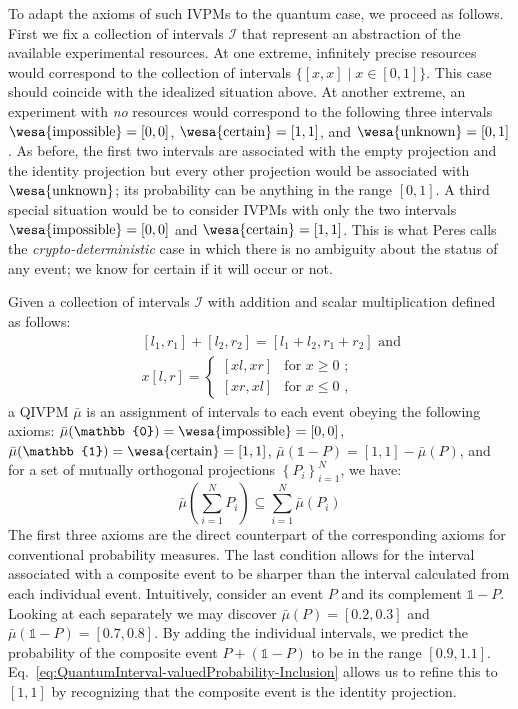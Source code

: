 \documentclass[english,reprint, aps, prl,superscriptaddress, showpacs,
showkeys, longbibliography, amsmath, amssymb]{revtex4-1}
\theoremstyle{plain}
\theoremstyle{definition}
\newcommand{\imposs}{{\text{\wesa{impossible}}}}
\newcommand{\necess}{{\text{\wesa{certain}}}}
\newcommand{\unknown}{{\text{\wesa{unknown}}}}
\begin{document}
To adapt the axioms of such IVPMs to the quantum case, we proceed as
follows. First we fix a collection of intervals $\mathscr{I}$ that
represent an abstraction of the available experimental resources. At
one extreme, infinitely precise resources would correspond to the
collection of intervals $\{[x,x] \mid x \in [0,1]\}$. This case should
coincide with the idealized situation above. At another extreme, an
experiment with \emph{no} resources would correspond to the following
three intervals $\imposs=\left[0,0\right]$,
$\necess=\left[1,1\right]$, and $\unknown=[0,1]$. As before, the first
two intervals are associated with the empty projection and the
identity projection but every other projection would be associated
with $\unknown$; its probability can be anything in the range
$[0,1]$. A third special situation would be to consider IVPMs with
only the two intervals $\imposs=\left[0,0\right]$ and
$\necess=\left[1,1\right]$. This is what Peres calls the
\emph{crypto-deterministic} case in which there is no ambiguity about
the status of any event; we know for certain if it will occur or not.

Given a collection of intervals $\mathscr{I}$ with addition and scalar
multiplication defined as follows: 
\begin{subequations}\label{eq:interval-operations}
\begin{eqnarray}
 &  & [l_{1},r_{1}]+[l_{2},r_{2}]=[l_{1}+l_{2},r_{1}+r_{2}]\textrm{ and}\\
 &  & x[l,r]=\begin{cases}
[xl,xr] & \textrm{for }x\ge0\textrm{ ;}\\{}
[xr,xl] & \textrm{for }x\le0\textrm{ ,}
\end{cases}
\end{eqnarray}
\end{subequations}
a QIVPM $\bar{\mu}$ is an assignment of intervals to each event
obeying the following axioms:
$\bar{\mu}(\mathbb{0})=\imposs=\left[0,0\right]$,
$\bar{\mu}(\mathbb{1})=\necess=\left[1,1\right]$,
$\bar{\mu}\left(\mathbb{1}-P\right)=\left[1,1\right]-\bar{\mu}\left(P\right)$,
and for a set of mutually orthogonal projections
$\left\{ P_{i}\right\} _{i=1}^{N}$, we have:
\begin{equation}
\bar{\mu}\left(\sum_{i=1}^{N}P_{i}\right)\subseteq\sum_{i=1}^{N}\bar{\mu}\left(P_{i}\right)\label{eq:QuantumInterval-valuedProbability-Inclusion}
\end{equation}
The first three axioms are the direct counterpart of the corresponding
axioms for conventional probability measures. The last condition
allows for the interval associated with a composite event to be
sharper than the interval calculated from each individual
event. Intuitively, consider an event $P$ and its complement
$\mathbb{1}-P$. Looking at each separately we may discover
$\bar{\mu}(P) = [0.2,0.3]$ and $\bar{\mu}(\mathbb{1}-P)=[0.7,0.8]$. By
adding the individual intervals, we predict the probability of the
composite event $P+(\mathbb{1}-P)$ to be in the range
$[0.9,1.1]$. Eq.~\ref{eq:QuantumInterval-valuedProbability-Inclusion}
allows us to refine this to $[1,1]$ by recognizing that the composite
event is the identity projection. 
\end{document}
